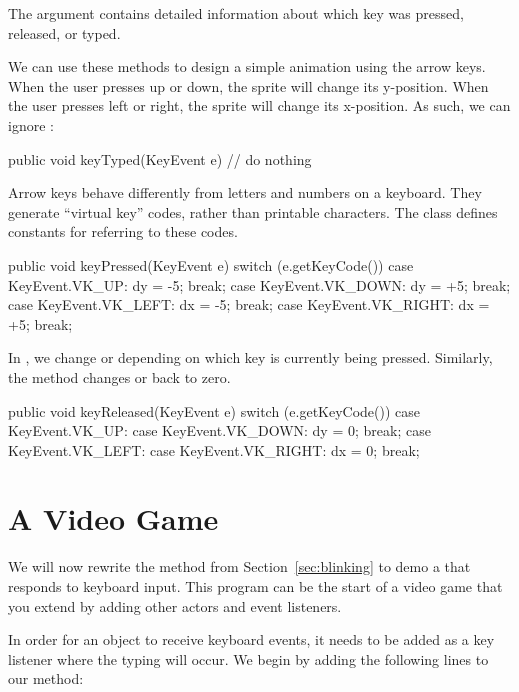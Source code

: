 The  argument contains detailed information about which key was pressed, released, or typed.

We can use these methods to design a simple animation using the arrow keys.
When the user presses up or down, the sprite will change its y-position.
When the user presses left or right, the sprite will change its x-position.
As such, we can ignore :

\begin{code}
public void keyTyped(KeyEvent e) {
    // do nothing
}
\end{code}

Arrow keys behave differently from letters and numbers on a keyboard.
They generate ``virtual key'' codes, rather than printable characters.
The  class defines constants for referring to these codes.

\begin{code}
public void keyPressed(KeyEvent e) {
    switch (e.getKeyCode()) {
        case KeyEvent.VK_UP:
            dy = -5;
            break;
        case KeyEvent.VK_DOWN:
            dy = +5;
            break;
        case KeyEvent.VK_LEFT:
            dx = -5;
            break;
        case KeyEvent.VK_RIGHT:
            dx = +5;
            break;
    }
}
\end{code}

In , we change  or  depending on which key is currently being pressed.
Similarly, the  method changes  or  back to zero.

\begin{code}
public void keyReleased(KeyEvent e) {
    switch (e.getKeyCode()) {
        case KeyEvent.VK_UP:
        case KeyEvent.VK_DOWN:
            dy = 0;
            break;
        case KeyEvent.VK_LEFT:
        case KeyEvent.VK_RIGHT:
            dx = 0;
            break;
    }
}
\end{code}


\section{A Video Game}

We will now rewrite the  method from Section~\ref{sec:blinking} to demo a  that responds to keyboard input.
This program can be the start of a video game that you extend by adding other actors and event listeners.

In order for an object to receive keyboard events, it needs to be added as a key listener where the typing will occur.
We begin by adding the following lines to our  method:

